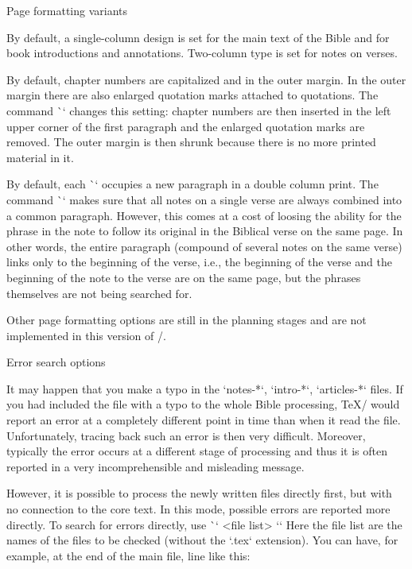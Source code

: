 {{\endtt
\sec Page formatting variants

By default, a single-column design is set for the main text of the Bible
and for book introductions and annotations. Two-column type is set for
notes on verses.

By default, chapter numbers are capitalized and in the outer margin. 
In the outer margin there are also enlarged quotation marks attached to quotations. 
The command \`\normalchapnumbers` changes this setting: chapter numbers are then inserted in the left
upper corner of the first paragraph and the enlarged quotation marks are removed.
The outer margin is then shrunk because there is no more printed material in it.  



By default, each \`\Note` occupies a new paragraph in a  double column print. 
The command \`\mergednotes` makes sure that all notes on a single verse are always 
combined into a common paragraph. 
However, this comes at a cost of loosing the ability for the phrase in the note
to follow its original in the Biblical verse on the same page.
In other words, the entire paragraph (compound of several notes on the same verse)
links only  to the beginning of the verse, i.e., the beginning of the verse 
and the beginning of the note to the verse are on the same page,
but the phrases themselves are not being searched for.

Other page formatting options are still in the planning stages and are not implemented in this version of \OpBible/.


\sec Error search options

It may happen that you make a typo in the `notes-*`, `intro-*`,
`articles-*` files. If you had included the file with a typo to the whole Bible processing,
\TeX/ would report an error at a completely different point in time than when it read the file. 
Unfortunately, tracing back such an error is then very difficult. Moreover, typically the error
occurs at a different stage of processing and thus it is often reported in a very
incomprehensible and misleading message.

However, it is possible to process the newly written files directly first, but with no
connection to the core text. In this mode, possible errors are reported more directly.
To search for errors directly, use \`\checksyntax` <file list> `{}`
Here the file list are the names of the files to be checked (without the `.tex` extension).
You can have, for example, at the end of the main file, line like this:

}}
